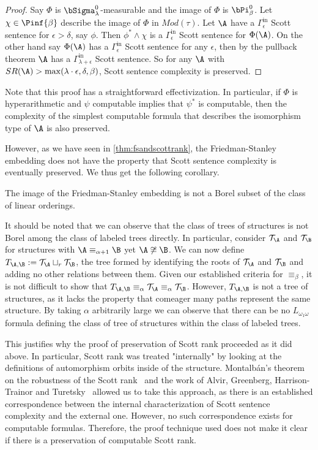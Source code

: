 \documentclass{amsart}
\newcommand{\T}{{\mathcal{T}}}
\newcommand{\SR}{SR}
\begin{document}
\begin{proof}
Say $\Phi$ is $\bSigma_\lambda^0$-measurable and the image of $\Phi$ is
$\bPi_\beta^0$. Let $\chi\in\Pinf{\beta}$ describe the image of $\Phi$ in
$Mod(\tau)$. 
Let $\A$ have a $\Gamma^{\mathrm{in}}_\epsilon$ Scott sentence for
$\epsilon>\delta$, say $\phi$. Then $\phi^*\land \chi$ is a
$\Gamma^\mathrm{in}_\epsilon$ Scott sentence for $\Phi(\A)$. On the other hand
say $\Phi(\A)$ has a $\Gamma^{\mathrm{in}}_\epsilon$ Scott sentence for any
$\epsilon$, then by the pullback theorem $\A$ has a
$\Gamma^{\mathrm{in}}_{\lambda+\epsilon}$ Scott sentence. So for any $\A$ with
$\SR(\A)>\max(\lambda\cdot \epsilon, \delta,\beta)$, Scott sentence complexity
is preserved.
\end{proof}

Note that this proof has a straightforward effectivization. In particular, if
$\Phi$ is hyperarithmetic and $\psi$ computable implies that $\psi^*$ is
computable, then the complexity of the simplest computable formula that
describes the isomorphism type of $\A$ is also preserved.

However, as we have seen in \cref{thm:fsandscottrank}, the Friedman-Stanley
embedding does not have the property that Scott sentence complexity is eventually
preserved. We thus get the following corollary.

\begin{corollary}
   The image of the Friedman-Stanley embedding is not a Borel subset of the
   class of linear orderings.
\end{corollary}

It should be noted that we can observe that the class of trees of structures is
not Borel among the class of labeled trees directly. In particular, consider
$\T_\A$ and $\T_\B$ for structures with $\A\equiv_{\alpha+1} \B$ yet
$\A\not\cong \B$. We can now define $T_{\A,\B}:= \T_\A\sqcup_r\T_\B$, the tree
formed by identifying the roots of $\T_\A$ and $\T_\B$ and adding no other
relations between them. Given our established criteria for $\equiv_\beta$, it is
not difficult to show that $T_{\A,\B}\equiv_{\alpha}\T_\A\equiv_{\alpha}\T_\B$.
However, $T_{\A,\B}$ is not a tree of structures, as it lacks the property that
comeager many paths represent the same structure. By taking $\alpha$ arbitrarily
large we can observe that there can be no $L_{\omega_1\omega}$ formula defining
the class of tree of structures within the class of labeled trees.

This justifies why the proof of preservation of Scott rank proceeded as it did above.
In particular, Scott rank was treated "internally" by looking at the definitions of automorphism orbits inside of the structure.
Montalb\'an's theorem on the robustness of the Scott rank~\cite{montalban2015}
and the work of Alvir, Greenberg, Harrison-Trainor and
Turetsky~\cite{alvir2021} allowed us to take this approach, as there is an established correspondence between the internal characterization of Scott sentence complexity and the external one.
However, no such correspondence exists for computable formulas.
Therefore, the proof technique used does not make it clear if there is a preservation of computable Scott rank.
\end{document}

